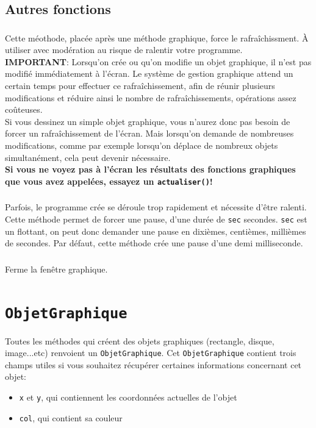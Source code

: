 \documentclass[11pt,a4paper]{article}
\begin{document}
\subsection*{Autres fonctions}

\subsubsection*{}
Cette méothode, placée après une méthode graphique, force le rafraîchissment. \`A utiliser avec modération au risque de ralentir votre programme.\\

{\bf IMPORTANT}: Lorsqu'on crée ou qu'on modifie un objet graphique, il n'est pas modifié immédiatement à l'écran. Le système de gestion graphique attend un certain temps pour effectuer ce rafraîchissement, afin de réunir plusieurs modifications et réduire ainsi le nombre de rafraîchissements, opérations assez coûteuses.\\
Si vous dessinez un simple objet graphique, vous n'aurez donc pas besoin de forcer un rafraîchissement de l'écran. Mais lorsqu'on demande de nombreuses modifications, comme par exemple lorsqu'on déplace de nombreux objets simultanément, cela peut devenir nécessaire.\\
{\bf Si vous ne voyez pas à l'écran les résultats des fonctions graphiques que vous avez appelées, essayez un {\tt actualiser()}!}

\subsubsection*{}
Parfois, le programme crée se déroule trop rapidement et nécessite d'être ralenti. Cette méthode permet de forcer une pause, d'une durée de {\tt sec} secondes. {\tt sec} est un flottant, on peut donc demander une pause en dixièmes, centièmes, millièmes de secondes. Par défaut, cette méthode crée une pause d'une demi milliseconde.

\subsubsection*{}
Ferme la fenêtre graphique.

\section{{\tt ObjetGraphique}}
Toutes les méthodes qui créent des objets graphiques (rectangle, disque, image...etc) renvoient un {\tt ObjetGraphique}. Cet {\tt ObjetGraphique} contient trois champs utiles si vous souhaitez récupérer certaines informations concernant cet objet:
\begin{itemize}
  \item {\tt x} et {\tt y}, qui contiennent les coordonnées actuelles de l'objet
  \item {\tt col}, qui contient sa couleur
\end{itemize}
\end{document}
